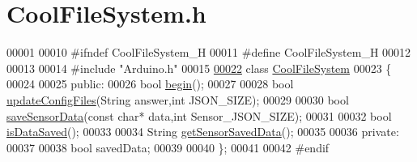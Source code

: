 \hypertarget{_cool_file_system_8h_source}{}\section{Cool\+File\+System.\+h}

\begin{DoxyCode}
00001 
00010 \textcolor{preprocessor}{#ifndef CoolFileSystem\_H}
00011 \textcolor{preprocessor}{#define CoolFileSystem\_H}
00012 
00013 
00014 \textcolor{preprocessor}{#include "Arduino.h"}
00015 
\hyperlink{class_cool_file_system}{00022} \textcolor{keyword}{class }\hyperlink{class_cool_file_system}{CoolFileSystem}
00023 \{
00024 
00025 \textcolor{keyword}{public}:
00026     \textcolor{keywordtype}{bool} \hyperlink{class_cool_file_system_a6ba6f666ed4c530174f8569d2c636748}{begin}(); 
00027 
00028     \textcolor{keywordtype}{bool} \hyperlink{class_cool_file_system_a32dad79ae80182a83e2e8f52286b7c7b}{updateConfigFiles}(String answer,\textcolor{keywordtype}{int} JSON\_SIZE);   
00029     
00030     \textcolor{keywordtype}{bool} \hyperlink{class_cool_file_system_a4c560c2ddd40b74b7758e6ceb2c58957}{saveSensorData}(\textcolor{keyword}{const} \textcolor{keywordtype}{char}* data,\textcolor{keywordtype}{int} Sensor\_JSON\_SIZE);
00031     
00032     \textcolor{keywordtype}{bool} \hyperlink{class_cool_file_system_a5a7eaeea7a9fbf8aaef651d862fa3b5b}{isDataSaved}();
00033     
00034     String \hyperlink{class_cool_file_system_a5c58bca3735c0ed3efb268d70ef998ef}{getSensorSavedData}();
00035         
00036 \textcolor{keyword}{private}:
00037     
00038     \textcolor{keywordtype}{bool} savedData; 
00039 
00040 \};
00041 
00042 \textcolor{preprocessor}{#endif}
\end{DoxyCode}
